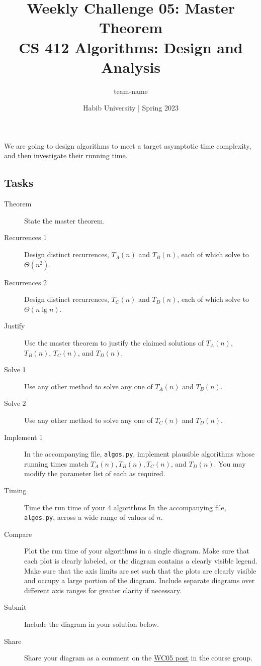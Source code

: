 \documentclass[a4paper]{exam}
\title{Weekly Challenge 05: Master Theorem\\CS 412 Algorithms: Design and Analysis}
\author{team-name}  %
\date{Habib University | Spring 2023}
\begin{document}
\maketitle

\begin{questions}

  

  We are going to design algorithms to meet a target asymptotic time complexity, and then investigate their running time.

  \subsection*{Tasks}
  \begin{description}
  \item[Theorem] State the master theorem.
  \item[Recurrences 1] Design distinct recurrences, $T_A(n)$ and $T_B(n)$, each of which solve to $\Theta(n^2)$.
  \item[Recurrences 2] Design distinct recurrences, $T_C(n)$ and $T_D(n)$, each of which solve to $\Theta(n\lg n)$.
  \item[Justify] Use the master theorem to justify the claimed solutions of  $T_A(n)$, $T_B(n)$, $T_C(n)$, and $T_D(n)$.
  \item[Solve 1] Use any other method to solve any one of  $T_A(n)$ and $T_B(n)$.
  \item[Solve 2] Use any other method to solve any one of  $T_C(n)$ and $T_D(n)$.
  \item[Implement 1] In the accompanying file, \texttt{algos.py}, implement plausible algorithms whose running times match $T_A(n),T_B(n), T_C(n)$, and $T_D(n)$. You may modify the parameter list of each as required.
  \item[Timing] Time the run time of your 4 algorithms In the accompanying file, \texttt{algos.py}, across a wide range of values of $n$.
  \item[Compare] Plot the run time of your algorithms in a single diagram. Make sure that each plot is clearly labeled, or the diagram contains a clearly visible legend. Make sure that the axis limits are set such that the plots are clearly visible and occupy a large portion of the diagram. Include separate diagrams over different axis ranges for greater clarity if necessary.
  \item[Submit] Include the diagram in your solution below.
  \item[Share] Share your diagram as a comment on the \href{https://web.yammer.com/main/org/habib.edu.pk/threads/eyJfdHlwZSI6IlRocmVhZCIsImlkIjoiMjEyMzI4NzkzMzY4MTY2NCJ9}{WC05 post} in the course group.
  \end{description}
  
  \begin{solution}
  \end{solution}

\end{questions}
\end{document}
